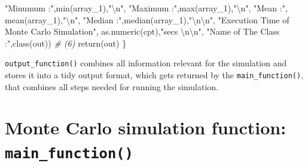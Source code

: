 \documentclass[11pt,a4paper]{article}
\newenvironment{Shaded}{\begin{snugshade}}{\end{snugshade}}
\newcommand{\CommentTok}[1]{\textcolor[rgb]{0.56,0.35,0.01}{\textit{#1}}}
\newcommand{\FunctionTok}[1]{\textcolor[rgb]{0.00,0.00,0.00}{#1}}
\newcommand{\NormalTok}[1]{#1}
\newcommand{\SpecialCharTok}[1]{\textcolor[rgb]{0.00,0.00,0.00}{#1}}
\newcommand{\StringTok}[1]{\textcolor[rgb]{0.31,0.60,0.02}{#1}}
\begin{document}
\begin{Shaded}
\begin{Highlighting}[]
           \StringTok{"Minumum :"}\NormalTok{,}\FunctionTok{min}\NormalTok{(array\_1),}\StringTok{"}\SpecialCharTok{\textbackslash{}n}\StringTok{"}\NormalTok{,}
           \StringTok{"Maximum :"}\NormalTok{,}\FunctionTok{max}\NormalTok{(array\_1),}\StringTok{"}\SpecialCharTok{\textbackslash{}n}\StringTok{"}\NormalTok{,}
           \StringTok{"Mean    :"}\NormalTok{, }\FunctionTok{mean}\NormalTok{(array\_1),}\StringTok{"}\SpecialCharTok{\textbackslash{}n}\StringTok{"}\NormalTok{,}
           \StringTok{"Median  :"}\NormalTok{,}\FunctionTok{median}\NormalTok{(array\_1),}\StringTok{"}\SpecialCharTok{\textbackslash{}n\textbackslash{}n}\StringTok{"}\NormalTok{,}
           \StringTok{"Execution Time of Monte Carlo Simulation"}\NormalTok{,}
           \FunctionTok{as.numeric}\NormalTok{(cpt),}\StringTok{"secs }\SpecialCharTok{\textbackslash{}n\textbackslash{}n}\StringTok{"}\NormalTok{,}
           \StringTok{"Name of The Class :"}\NormalTok{,}\FunctionTok{class}\NormalTok{(out))}
  \CommentTok{\# (6)}
  \FunctionTok{return}\NormalTok{(out)}
\NormalTok{\}}
\end{Highlighting}
\end{Shaded}

\texttt{output\_function()} combines all information relevant for the
simulation and stores it into a tidy output format, which gets returned
by the \texttt{main\_function()}, that combines all steps needed for
running the simulation.

\pagebreak

\hypertarget{monte-carlo-simulation-function-main_function}{%
\section{\texorpdfstring{Monte Carlo simulation function:
\texttt{main\_function()}}{Monte Carlo simulation function: main\_function()}}\label{monte-carlo-simulation-function-main_function}}
\end{document}

